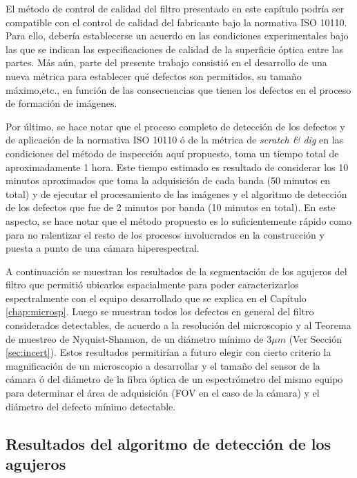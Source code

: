 El método de control de calidad del filtro presentado en este capítulo podría ser compatible con el control de calidad del fabricante bajo la normativa ISO 10110. Para ello, debería establecerse un acuerdo en las condiciones experimentales bajo las que se indican las especificaciones de calidad de la superficie óptica entre las partes. Más aún, parte del presente trabajo consistió en el desarrollo de una nueva métrica para establecer qué defectos son permitidos, su tamaño máximo,etc., en función de las consecuencias que tienen los defectos en el proceso de formación de imágenes.

Por último, se hace notar que el proceso completo de detección de los defectos y de aplicación de la normativa ISO 10110 ó de la métrica de \textit{scratch \& dig} en las condiciones del método de inspección aquí propuesto, toma un tiempo total de aproximadamente 1 hora. Este tiempo estimado es resultado de considerar los 10 minutos aproximados que toma la adquisición de cada banda (50 minutos en total) y de ejecutar el procesamiento de las imágenes y el algoritmo de detección de los defectos que fue de 2 minutos por banda (10 minutos en total). En este aspecto, se hace notar que el método propuesto es lo suficientemente rápido como para no ralentizar el resto de los procesos involucrados en la construcción y puesta a punto de una cámara hiperespectral.

A continuación se muestran los resultados de la segmentación de los agujeros del filtro que permitió ubicarlos espacialmente para poder caracterizarlos espectralmente con el equipo desarrollado que se explica en el Capítulo \ref{chap:microsp}. Luego se muestran todos los defectos en general del filtro considerados detectables, de acuerdo a la resolución del microscopio y al Teorema de muestreo de Nyquist-Shannon, de un diámetro mínimo de $3 \mu m$ (Ver Sección \ref{sec:incert}). Estos resultados permitirían a futuro elegir con cierto criterio la magnificación de un microscopio a desarrollar y el tamaño del sensor de la cámara ó del diámetro de la fibra óptica de un espectrómetro del mismo equipo para determinar el área de adquisición (FOV en el caso de la cámara) y el diámetro del defecto mínimo detectable.

\singlespacing
\subsection{Resultados del algoritmo de detección de los agujeros}
\label{sec:aguj}

